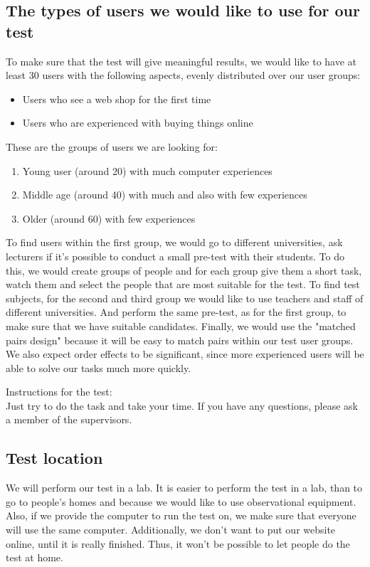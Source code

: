 \subsection{The types of users we would like to use for our test}
To make sure that the test will give meaningful results, we would like to have at least 30 users with the following aspects, evenly distributed over our user groups:
\begin{itemize}\addtolength{\itemsep}{-0.5\baselineskip}
	\item Users who see a web shop for the first time
	\item Users who are experienced with buying things online
\end{itemize}
These are the groups of users we are looking for:
\begin{enumerate}\addtolength{\itemsep}{-0.5\baselineskip}
	\item Young user (around 20) with much computer experiences
	\item Middle age (around 40) with much and also with few experiences
	\item Older (around 60) with few experiences
\end{enumerate}
To find users within the first group, we would go to different universities, ask lecturers if it's possible to conduct a small pre-test with their students. To do this, we would create groups of people and for each group give them a short task, watch them and select the people that are most suitable for the test.
To find test subjects, for the second and third group we would like to use teachers and staff of different universities. And perform the same pre-test, as for the first group, to make sure that we have suitable candidates.
Finally, we would use the "matched pairs design" because it will be easy to match pairs within our test user groups. We also expect order effects to be significant, since more experienced users will be able to solve our tasks much more quickly.

Instructions for the test:\\
Just try to do the task and take your time. If you have any questions, please ask a member of the supervisors.

\subsection{Test location}
We will perform our test in a lab. It is easier to perform the test in a lab, than to go to people's homes and because we would like to use observational equipment. Also, if we provide the computer to run the test on, we make sure that everyone will use the same computer. Additionally, we don't want to put our website online, until it is really finished. Thus, it won't be possible to let people do the test at home.

